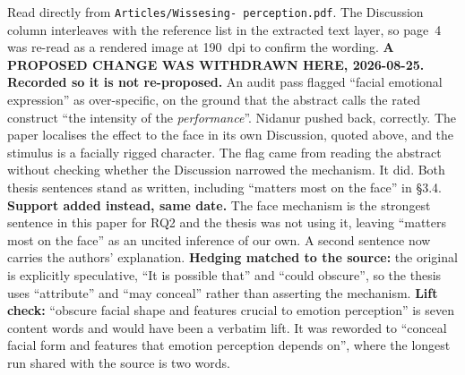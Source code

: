\documentclass[11pt, a4paper]{article}
\begin{document}
\begin{Form}
  {Read directly from \texttt{\footnotesize Articles/Wissesing- perception.pdf}. The Discussion column interleaves with the reference list in the extracted text layer, so page~4 was re-read as a rendered image at 190~dpi to confirm the wording. \textbf{A PROPOSED CHANGE WAS WITHDRAWN HERE, 2026-08-25. Recorded so it is not re-proposed.} An audit pass flagged ``facial emotional expression'' as over-specific, on the ground that the abstract calls the rated construct ``the intensity of the \emph{performance}''. Nidanur pushed back, correctly. The paper localises the effect to the face in its own Discussion, quoted above, and the stimulus is a facially rigged character. The flag came from reading the abstract without checking whether the Discussion narrowed the mechanism. It did. Both thesis sentences stand as written, including ``matters most on the face'' in \S3.4. \textbf{Support added instead, same date.} The face mechanism is the strongest sentence in this paper for RQ2 and the thesis was not using it, leaving ``matters most on the face'' as an uncited inference of our own. A second sentence now carries the authors' explanation. \textbf{Hedging matched to the source:} the original is explicitly speculative, ``It is possible that'' and ``could obscure'', so the thesis uses ``attribute'' and ``may conceal'' rather than asserting the mechanism. \textbf{Lift check:} ``obscure facial shape and features crucial to emotion perception'' is seven content words and would have been a verbatim lift. It was reworded to ``conceal facial form and features that emotion perception depends on'', where the longest run shared with the source is two words.}


\end{Form}
\end{document}
